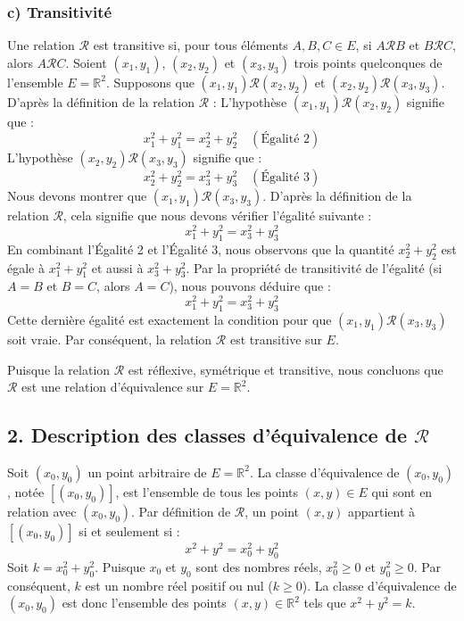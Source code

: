 \documentclass{report}
\begin{document}
\subsubsection*{c) Transitivité}
Une relation $\mathcal{R}$ est transitive si, pour tous éléments $A, B, C \in E$, si $A \mathcal{R} B$ et $B \mathcal{R} C$, alors $A \mathcal{R} C$.
Soient $(x_1, y_1)$, $(x_2, y_2)$ et $(x_3, y_3)$ trois points quelconques de l'ensemble $E = \mathbb{R}^2$.
Supposons que $(x_1, y_1) \mathcal{R} (x_2, y_2)$ et $(x_2, y_2) \mathcal{R} (x_3, y_3)$.
D'après la définition de la relation $\mathcal{R}$ :
L'hypothèse $(x_1, y_1) \mathcal{R} (x_2, y_2)$ signifie que :
$$ x_1^2 + y_1^2 = x_2^2 + y_2^2 \quad (\text{Égalité 2}) $$
L'hypothèse $(x_2, y_2) \mathcal{R} (x_3, y_3)$ signifie que :
$$ x_2^2 + y_2^2 = x_3^2 + y_3^2 \quad (\text{Égalité 3}) $$
Nous devons montrer que $(x_1, y_1) \mathcal{R} (x_3, y_3)$.
D'après la définition de la relation $\mathcal{R}$, cela signifie que nous devons vérifier l'égalité suivante :
$$ x_1^2 + y_1^2 = x_3^2 + y_3^2 $$
En combinant l'Égalité 2 et l'Égalité 3, nous observons que la quantité $x_2^2 + y_2^2$ est égale à $x_1^2 + y_1^2$ et aussi à $x_3^2 + y_3^2$.
Par la propriété de transitivité de l'égalité (si $A=B$ et $B=C$, alors $A=C$), nous pouvons déduire que :
$$ x_1^2 + y_1^2 = x_3^2 + y_3^2 $$
Cette dernière égalité est exactement la condition pour que $(x_1, y_1) \mathcal{R} (x_3, y_3)$ soit vraie.
Par conséquent, la relation $\mathcal{R}$ est transitive sur $E$.

Puisque la relation $\mathcal{R}$ est réflexive, symétrique et transitive, nous concluons que $\mathcal{R}$ est une relation d'équivalence sur $E = \mathbb{R}^2$.

\subsection*{2. Description des classes d'équivalence de $\mathcal{R}$}

Soit $(x_0, y_0)$ un point arbitraire de $E = \mathbb{R}^2$. La classe d'équivalence de $(x_0, y_0)$, notée $[(x_0, y_0)]$, est l'ensemble de tous les points $(x, y) \in E$ qui sont en relation avec $(x_0, y_0)$.
Par définition de $\mathcal{R}$, un point $(x, y)$ appartient à $[(x_0, y_0)]$ si et seulement si :
$$ x^2 + y^2 = x_0^2 + y_0^2 $$
Soit $k = x_0^2 + y_0^2$. Puisque $x_0$ et $y_0$ sont des nombres réels, $x_0^2 \ge 0$ et $y_0^2 \ge 0$. Par conséquent, $k$ est un nombre réel positif ou nul ($k \ge 0$).
La classe d'équivalence de $(x_0, y_0)$ est donc l'ensemble des points $(x, y) \in \mathbb{R}^2$ tels que $x^2 + y^2 = k$.
\end{document}
